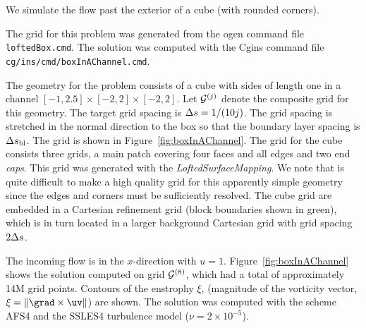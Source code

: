{We simulate the flow past the exterior of a cube (with rounded corners).

The grid for this problem was generated from the ogen command file {\tt loftedBox.cmd}.
The solution was computed with the Cgins command file {\tt cg/ins/cmd/boxInAChannel.cmd}.

The geometry for the problem consists of a cube with sides of length one in a channel $[-1,2.5]\times[-2,2]\times[-2,2]$. 
Let ${\mathcal G}^{(j)}$ denote the composite grid for this geometry. The target grid spacing is $\Delta s=1/(10 j)$.
The grid spacing is stretched in the normal direction to the box so that the boundary layer
spacing is $\Delta s_{\rm bl}$. 
The grid is shown in Figure~\ref{fig:boxInAChannel}. The grid for the cube consists three grids, a main patch
covering four faces and all edges and two end {\em caps}. This grid was generated with the {\em LoftedSurfaceMapping}.
We note that is quite difficult to make a high quality grid for this apparently simple geometry since the
edges and corners must be sufficiently resolved. 
The cube grid are embedded in a Cartesian refinement grid (block boundaries shown in green), which is 
in turn located in a larger background
Cartesian grid with grid spacing $2\Delta s$. 


The incoming flow is in the $x$-direction with $u=1$.
Figure~\ref{fig:boxInAChannel} shows the solution computed on grid ${\mathcal G}^{(8)}$, which had
a total of approximately 14M grid points.
Contours of the enstrophy $\xi$, (magnitude of the vorticity vector, $\xi=\| \grad\times \uv\|$) are shown.
The solution was computed with the scheme AFS4 and the SSLES4 turbulence model ($\nu=2\times10^{-5}$). 


}

